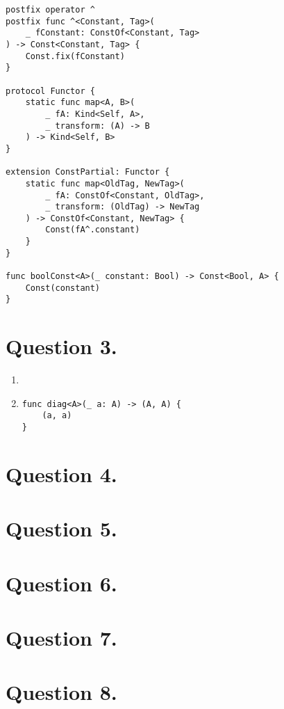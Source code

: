 \documentclass{article}
\begin{document}
\begin{enumerate}[label=(\alph*)]
\begin{verbatim}
postfix operator ^
postfix func ^<Constant, Tag>(
	_ fConstant: ConstOf<Constant, Tag>
) -> Const<Constant, Tag> {
	Const.fix(fConstant)
}

protocol Functor {
	static func map<A, B>(
		_ fA: Kind<Self, A>,
		_ transform: (A) -> B
	) -> Kind<Self, B>
}

extension ConstPartial: Functor {
	static func map<OldTag, NewTag>(
		_ fA: ConstOf<Constant, OldTag>,
		_ transform: (OldTag) -> NewTag
	) -> ConstOf<Constant, NewTag> {
		Const(fA^.constant)
	}
}

func boolConst<A>(_ constant: Bool) -> Const<Bool, A> {
	Const(constant)
}
\end{verbatim}

\end{enumerate}

\section*{Question 3.}

\begin{enumerate}[label=(\alph*)]

\item

\item

\begin{verbatim}
func diag<A>(_ a: A) -> (A, A) {
	(a, a)
}
\end{verbatim}

\end{enumerate}

\section*{Question 4.}

\section*{Question 5.}

\section*{Question 6.}

\section*{Question 7.}

\section*{Question 8.}
\end{document}
